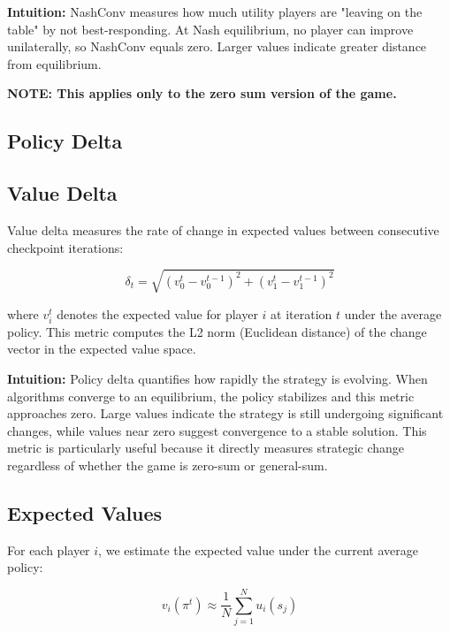 \documentclass[11pt]{article}
\newcommand{\amy}[1]{{\color{red}[\textsc{Amy}: \emph{#1}]}}
\begin{document}
\textbf{Intuition:} NashConv measures how much utility players are "leaving on the table" by not best-responding. At Nash equilibrium, no player can improve unilaterally, so NashConv equals zero. Larger values indicate greater distance from equilibrium.

\textbf{NOTE: This applies only to the zero sum version of the game.}






\subsection{Policy Delta}




\subsection{Value Delta}

Value delta measures the rate of change in expected values between consecutive checkpoint iterations:

\begin{equation}
\delta_t = \sqrt{(v_0^t - v_0^{t-1})^2 + (v_1^t - v_1^{t-1})^2}
\end{equation}

where $v_i^t$ denotes the expected value for player $i$ at iteration $t$ under the average policy. This metric computes the L2 norm (Euclidean distance) of the change vector in the expected value space.

\textbf{Intuition:} Policy delta quantifies how rapidly the strategy is evolving. When algorithms converge to an equilibrium, the policy stabilizes and this metric approaches zero. Large values indicate the strategy is still undergoing significant changes, while values near zero suggest convergence to a stable solution. This metric is particularly useful because it directly measures strategic change regardless of whether the game is zero-sum or general-sum.

\subsection{Expected Values}

For each player $i$, we estimate the expected value under the current average policy:

\begin{equation}
v_i(\pi^t) \approx \frac{1}{N} \sum_{j=1}^{N} u_i(s_j)
\end{equation}
\end{document}
